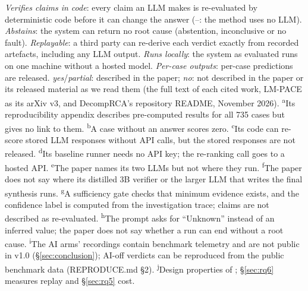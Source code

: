 \begin{table}[t]
\smallskip
\raggedright
\emph{Verifies claims in code}: every claim an LLM makes is re-evaluated by deterministic code before it can change the answer (--: the method uses no LLM).
\emph{Abstains}: the system can return no root cause (abstention, inconclusive or no fault).
\emph{Replayable}: a third party can re-derive each verdict exactly from recorded artefacts, including any LLM output.
\emph{Runs locally}: the system as evaluated runs on one machine without a hosted model.
\emph{Per-case outputs}: per-case predictions are released.
\emph{yes}/\emph{partial}: described in the paper; \emph{no}: not described in the paper or its released material as we read them (the full text of each cited work, LM-PACE as its arXiv v3, and DecompRCA's repository README, November 2026).
\textsuperscript{a}Its reproducibility appendix describes pre-computed results for all 735 cases but gives no link to them.
\textsuperscript{b}A case without an answer scores zero.
\textsuperscript{c}Its code can re-score stored LLM responses without API calls, but the stored responses are not released.
\textsuperscript{d}Its baseline runner needs no API key; the re-ranking call goes to a hosted API.
\textsuperscript{e}The paper names its two LLMs but not where they run.
\textsuperscript{f}The paper does not say where its distilled 3B verifier or the larger LLM that writes the final synthesis runs.
\textsuperscript{g}A sufficiency gate checks that minimum evidence exists, and the confidence label is computed from the investigation trace; claims are not described as re-evaluated.
\textsuperscript{h}The prompt asks for ``Unknown'' instead of an inferred value; the paper does not say whether a run can end without a root cause.
\textsuperscript{i}The AI arms' recordings contain benchmark telemetry and are not public in v1.0 (\S\ref{sec:conclusion}); AI-off verdicts can be reproduced from the public benchmark data (REPRODUCE.md §2).
\textsuperscript{j}Design properties of \sys; \S\ref{sec:rq6} measures replay and \S\ref{sec:rq5} cost.
\end{table}
